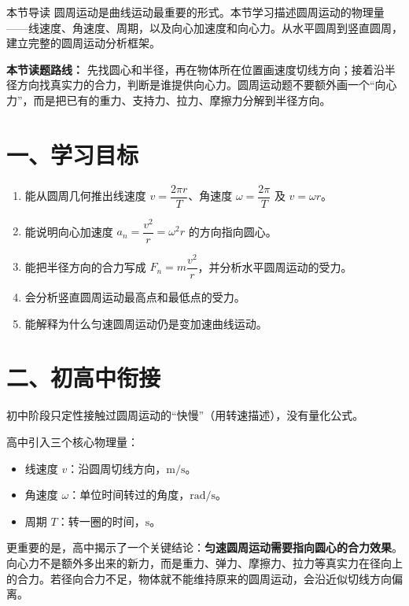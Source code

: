 
\begin{learningbox}{本节导读}
圆周运动是曲线运动最重要的形式。本节学习描述圆周运动的物理量——线速度、角速度、周期，以及向心加速度和向心力。从水平圆周到竖直圆周，建立完整的圆周运动分析框架。
\end{learningbox}

\textbf{本节读题路线：} 先找圆心和半径，再在物体所在位置画速度切线方向；接着沿半径方向找真实力的合力，判断是谁提供向心力。圆周运动题不要额外画一个“向心力”，而是把已有的重力、支持力、拉力、摩擦力分解到半径方向。

\section*{一、学习目标}

\begin{enumerate}
  \item 能从圆周几何推出线速度 $v = \dfrac{2\pi r}{T}$、角速度 $\omega = \dfrac{2\pi}{T}$ 及 $v = \omega r$。
  \item 能说明向心加速度 $a_n = \dfrac{v^2}{r} = \omega^2 r$ 的方向指向圆心。
  \item 能把半径方向的合力写成 $F_n = m\dfrac{v^2}{r}$，并分析水平圆周运动的受力。
  \item 会分析竖直圆周运动最高点和最低点的受力。
  \item 能解释为什么匀速圆周运动仍是变加速曲线运动。
\end{enumerate}
\section*{二、初高中衔接}

初中阶段只定性接触过圆周运动的“快慢”（用转速描述），没有量化公式。

高中引入三个核心物理量：
\begin{itemize}
  \item 线速度 $v$：沿圆周切线方向，$\mathrm{m/s}$。
  \item 角速度 $\omega$：单位时间转过的角度，$\mathrm{rad/s}$。
  \item 周期 $T$：转一圈的时间，$\mathrm{s}$。
\end{itemize}

更重要的是，高中揭示了一个关键结论：\textbf{匀速圆周运动需要指向圆心的合力效果}。向心力不是额外多出来的新力，而是重力、弹力、摩擦力、拉力等真实力在径向上的合力。若径向合力不足，物体就不能维持原来的圆周运动，会沿近似切线方向偏离。

